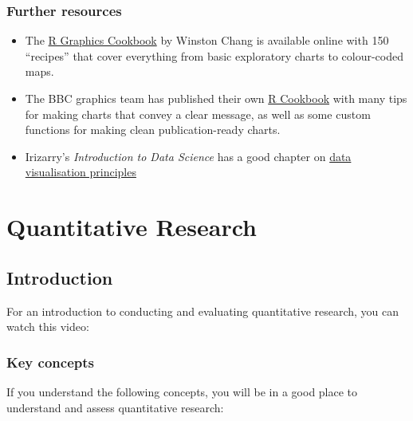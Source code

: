 \documentclass[
]{book}
\providecommand{\tightlist}{%
  \setlength{\itemsep}{0pt}\setlength{\parskip}{0pt}}
\begin{document}
\hypertarget{further-resources-visualisation}{%
\section{Further resources}\label{further-resources-visualisation}}

\begin{itemize}
\tightlist
\item
  The \href{https://r-graphics.org/}{R Graphics Cookbook} by Winston Chang is available online with 150 ``recipes'' that cover everything from basic exploratory charts to colour-coded maps.
\item
  The BBC graphics team has published their own \href{https://bbc.github.io/rcookbook/}{R Cookbook} with many tips for making charts that convey a clear message, as well as some custom functions for making clean publication-ready charts.
\item
  Irizarry's \emph{Introduction to Data Science} has a good chapter on \href{https://rafalab.github.io/dsbook/data-visualization-principles.html}{data visualisation principles}
\end{itemize}

\hypertarget{part-quantitative-research}{%
\part*{Quantitative Research}\label{part-quantitative-research}}

\hypertarget{introduction}{%
\chapter{Introduction}\label{introduction}}

For an introduction to conducting and evaluating quantitative research, you can watch this video:

\hypertarget{key-concepts}{%
\section{Key concepts}\label{key-concepts}}

If you understand the following concepts, you will be in a good place to understand and assess quantitative research:
\end{document}
